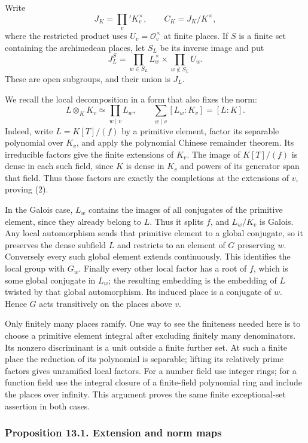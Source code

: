 \documentclass[11pt,a4paper]{article}
\begin{document}
Write \[
J_K=\prod_v'K_v^\times,\qquad C_K=J_K/K^\times,
\] where the restricted product uses \(U_v=\mathcal O_v^\times\) at
finite places. If \(S\) is a finite set containing the archimedean
places, let \(S_L\) be its inverse image and put \[
J_L^S=\prod_{w\in S_L}L_w^\times\times
                \prod_{w\notin S_L}U_w.
\tag{1}
\] These are open subgroups, and their union is \(J_L\).

We recall the local decomposition in a form that also fixes the norm: \[
L\otimes_K K_v\simeq\prod_{w\mid v}L_w,\qquad
\sum_{w\mid v}[L_w:K_v]=[L:K].
\tag{2}
\] Indeed, write \(L=K[T]/(f)\) by a primitive element, factor its
separable polynomial over \(K_v\), and apply the polynomial Chinese
remainder theorem. Its irreducible factors give the finite extensions of
\(K_v\). The image of \(K[T]/(f)\) is dense in each such field, since
\(K\) is dense in \(K_v\) and powers of its generator span that field.
Thus those factors are exactly the completions at the extensions of
\(v\), proving (2).

In the Galois case, \(L_w\) contains the images of all conjugates of the
primitive element, since they already belong to \(L\). Thus it splits
\(f\), and \(L_w/K_v\) is Galois. Any local automorphism sends that
primitive element to a global conjugate, so it preserves the dense
subfield \(L\) and restricts to an element of \(G\) preserving \(w\).
Conversely every such global element extends continuously. This
identifies the local group with \(G_w\). Finally every other local
factor has a root of \(f\), which is some global conjugate in \(L_w\);
the resulting embedding is the embedding of \(L\) twisted by that global
automorphism. Its induced place is a conjugate of \(w\). Hence \(G\)
acts transitively on the places above \(v\).

Only finitely many places ramify. One way to see the finiteness needed
here is to choose a primitive element integral after excluding finitely
many denominators. Its nonzero discriminant is a unit outside a finite
further set. At such a finite place the reduction of its polynomial is
separable; lifting its relatively prime factors gives unramified local
factors. For a number field use integer rings; for a function field use
the integral closure of a finite-field polynomial ring and include the
places over infinity. This argument proves the same finite
exceptional-set assertion in both cases.

\subsubsection{Proposition 13.1. Extension and norm
maps}\label{proposition-13.1.-extension-and-norm-maps}
\end{document}
